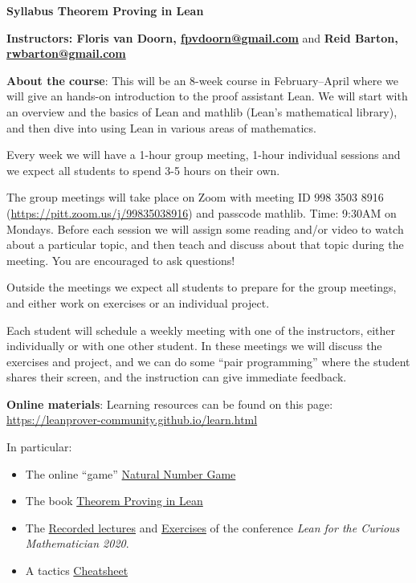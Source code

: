 \documentclass[10pt]{article}
\begin{document}
\mbox{}\vspace*{-15mm}
\begin{center}
{\large\bf Syllabus Theorem Proving in Lean}

{\bf Instructors: Floris van Doorn, \url{fpvdoorn@gmail.com}} and {\bf Reid Barton, \url{rwbarton@gmail.com }}
\end{center}

\textbf{About the course}:
This will be an 8-week course in February--April where we will give an hands-on introduction to the proof assistant Lean. We will start with an overview and the basics of Lean and \textsf{mathlib} (Lean's mathematical library), and then dive into using Lean in various areas of mathematics.

Every week we will have a 1-hour group meeting, 1-hour individual sessions and we expect all students to spend 3-5 hours on their own.

The group meetings will take place on Zoom with meeting ID 998 3503 8916 (\url{https://pitt.zoom.us/j/99835038916}) and passcode \textsf{mathlib}. Time: 9:30AM on Mondays. Before each session we will assign some reading and/or video to watch about a particular topic, and then teach and discuss about that topic during the meeting. You are encouraged to ask questions!

Outside the meetings we expect all students to prepare for the group meetings, and either work on exercises or an individual project.

Each student will schedule a weekly meeting with one of the instructors, either individually or with one other student. In these meetings we will discuss the exercises and project, and we can do some ``pair programming'' where the student shares their screen, and the instruction can give immediate feedback.

\textbf{Online materials}:
Learning resources can be found on this page: \url{https://leanprover-community.github.io/learn.html}

In particular:
\begin{itemize}
\item The online ``game'' \href{http://wwwf.imperial.ac.uk/~buzzard/xena/natural_number_game/}{Natural Number Game}
\item The book \href{https://leanprover.github.io/theorem_proving_in_lean/}{Theorem Proving in Lean}
\item The \href{https://www.youtube.com/playlist?list=PLlF-CfQhukNlxexiNJErGJd2dte_J1t1N}{Recorded lectures} and \href{https://leanprover-community.github.io/lftcm2020/exercises.html}{Exercises} of the conference \emph{Lean for the Curious Mathematician 2020}.
\item A tactics \href{https://leanprover-community.github.io//img/lean-tactics.pdf}{Cheatsheet}
\end{itemize}
\end{document}
